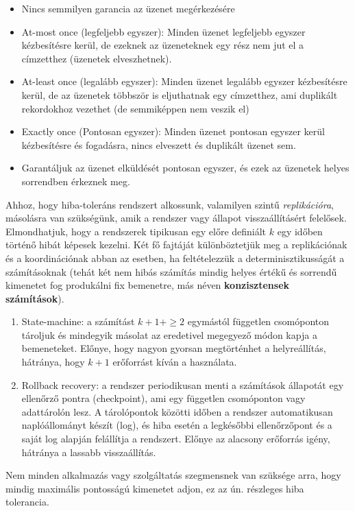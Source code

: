 \documentclass[a4paper,12pt]{article}
\begin{document}
\begin{itemize}
\item Nincs semmilyen garancia az üzenet megérkezésére
\item At-most once (legfeljebb egyszer): Minden üzenet legfeljebb egyszer kézbesítésre kerül, de ezeknek az üzeneteknek egy rész nem jut el a címzetthez (üzenetek elveszhetnek).
\item At-least once (legalább egyszer): Minden üzenet legalább egyszer kézbesítésre kerül, de az üzenetek többször is eljuthatnak egy címzetthez, ami duplikált rekordokhoz vezethet (de semmiképpen nem veszik el)
\item Exactly once (Pontosan egyszer): Minden üzenet pontosan egyszer kerül kézbesítésre és fogadásra, nincs elveszett és duplikált üzenet sem.
\item Garantáljuk az üzenet elküldését pontosan egyszer, és ezek az üzenetek helyes sorrendben érkeznek meg.
\end{itemize}

Ahhoz, hogy hiba-toleráns rendszert alkossunk, valamilyen szintű \textit{replikációra}, másolásra van szükségünk, amik a rendszer vagy állapot visszaállításért felelősek. Elmondhatjuk, hogy a rendszerek tipikusan egy előre definiált $k$ egy időben történő hibát képesek kezelni. Két\cite{balazinska} fő fajtáját különböztetjük meg a replikációnak és a koordinációnak abban az esetben, ha feltételezzük a determinisztikusságát a számításoknak (tehát két nem hibás számítás mindig helyes értékű és sorrendű kimenetet fog produkálni fix bemenetre, más néven \textbf{konzisztensek számítások}). 

\begin{enumerate}
\item State-machine: a számítást $k+1+\ge2$ egymástól független csomóponton tároljuk és mindegyik másolat az eredetivel megegyező módon kapja a bemeneteket. Előnye, hogy nagyon gyorsan megtörténhet a helyreállítás, hátránya, hogy $k+1$ erőforrást kíván a használata.
\item Rollback recovery: a rendszer periodikusan menti a számítások állapotát egy ellenőrző pontra (checkpoint), ami egy független csomóponton vagy adattárolón lesz. A tárolópontok közötti időben a rendszer automatikusan naplóállományt készít (log), és hiba esetén a legkésőbbi ellenőrzőpont és a saját log alapján felállítja a rendszert. Előnye az alacsony erőforrás igény, hátránya a lassabb visszaállítás. 
\end{enumerate}

Nem minden alkalmazás vagy szolgáltatás szegmensnek van szüksége arra, hogy mindig maximális pontosságú kimenetet adjon, ez az ún. részleges hiba tolerancia. 
\end{document}
